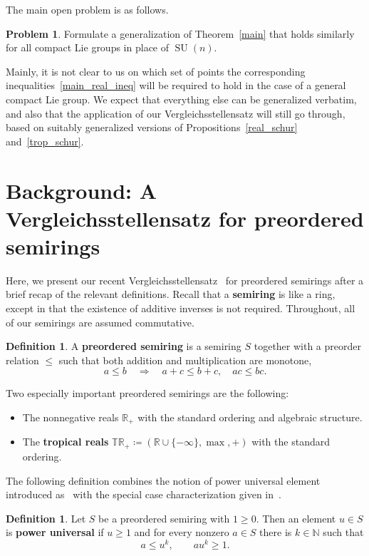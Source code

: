 \documentclass[11pt]{article}
\theoremstyle{definition}
\newtheorem{defi}[theo]{Definition}
\newtheorem{prob}[theo]{Problem}
\numberwithin{equation}{section}
\newcommand{\N}{\mathbb{N}}
\newcommand{\R}{\mathbb{R}}
\newcommand{\TR}{\mathbb{TR}}
\DeclareMathOperator{\SU}{SU}
\newcommand{\newterm}[1]{\textbf{#1}}
\begin{document}
The main open problem is as follows.

\begin{prob}
	Formulate a generalization of Theorem~\ref{main} that holds similarly for all compact Lie groups in place of $\SU(n)$.
\end{prob}

Mainly, it is not clear to us on which set of points the corresponding inequalities~\eqref{main_real_ineq} will be required to hold in the case of a general compact Lie group.
We expect that everything else can be generalized verbatim, and also that the application of our Vergleichsstellensatz will still go through, based on suitably generalized versions of Propositions~\ref{real_schur} and~\ref{trop_schur}.

\section{Background: A Vergleichsstellensatz for preordered semirings}
\label{vss_back}

Here, we present our recent Vergleichsstellensatz~\cite[Theorem~7.15]{vergleichsstellensatz} for preordered semirings after a brief recap of the relevant definitions.
Recall that a \newterm{semiring} is like a ring, except in that the existence of additive inverses is not required. 
Throughout, all of our semirings are assumed commutative.

\begin{defi}
	A \newterm{preordered semiring} is a semiring $S$ together with a preorder relation $\le$ such that both addition and multiplication are monotone,
	\[
		a \le b \quad\Longrightarrow\quad a + c \le b + c, \quad ac \le bc.
	\]
\end{defi}

Two especially important preordered semirings are the following:
\begin{itemize}
	\item The nonnegative reals $\R_+$ with the standard ordering and algebraic structure.
	\item The \newterm{tropical reals} $\TR_+ \coloneqq (\R \cup \{-\infty\}, \max, +)$ with the standard ordering.
\end{itemize}

The following definition combines the notion of power universal element introduced as~\cite[Definition~3.27]{vergleichsstellensatz} with the special case characterization given in~\cite[Lemma~3.29]{vergleichsstellensatz}.

\begin{defi}
	Let $S$ be a preordered semiring with $1 \ge 0$. Then an element $u \in S$ is \newterm{power universal} if $u \ge 1$ and for every nonzero $a \in S$ there is $k \in \N$ such that
	\[
		a \le u^k, \qquad a u^k \ge 1.
	\]
\end{defi}
\end{document}
